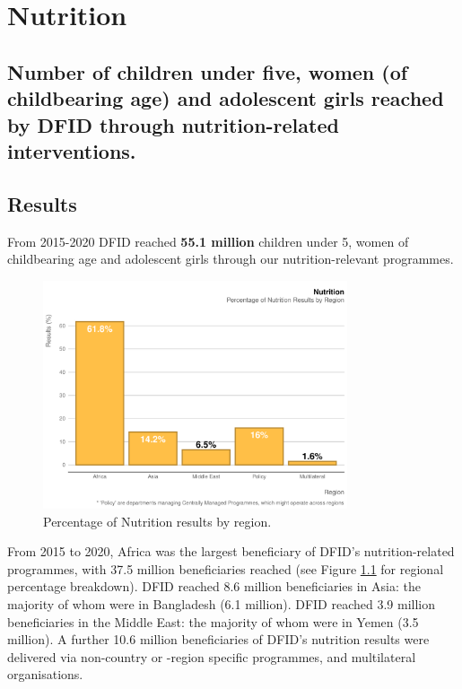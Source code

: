 \chapter{Nutrition}

\section*{Number of children under five, women (of childbearing age) and adolescent girls reached by DFID through nutrition-related interventions.}
\thispagestyle{empty}

\section{Results}

From 2015-2020 DFID reached \textbf{55.1 million} children under 5, women of childbearing age and adolescent girls through our nutrition-relevant programmes. %

\begin{figure}[htbp]
	\centering
	\includegraphics[width=0.8\textwidth]{../figs/nutrition_region_plot} \hfill
	\caption{Percentage of Nutrition results by region.}\label{fig:nutrition_region_plot}
\end{figure}


From 2015 to 2020, Africa was the largest beneficiary of DFID’s nutrition-related programmes, with 37.5 million beneficiaries reached (see Figure \ref{fig:nutrition_region_plot} for regional percentage breakdown). %
DFID reached 8.6 million beneficiaries in Asia: the majority of whom were in Bangladesh (6.1 million). %
DFID reached 3.9 million beneficiaries in the Middle East: the majority of whom were in Yemen (3.5 million). %
A further 10.6 million beneficiaries of DFID's nutrition results were delivered via non-country or -region specific programmes, and multilateral organisations. %

